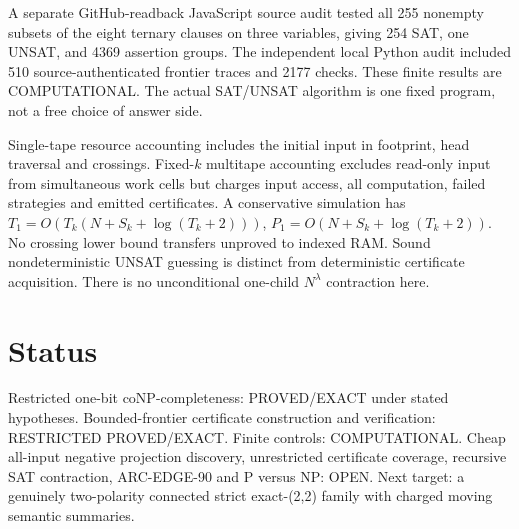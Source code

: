 \documentclass[11pt]{article}
\begin{document}
A separate GitHub-readback JavaScript source audit tested all 255 nonempty subsets of the eight ternary clauses on three variables, giving 254 SAT, one UNSAT, and 4369 assertion groups. The independent local Python audit included 510 source-authenticated frontier traces and 2177 checks. These finite results are COMPUTATIONAL. The actual SAT/UNSAT algorithm is one fixed program, not a free choice of answer side.

Single-tape resource accounting includes the initial input in footprint, head traversal and crossings. Fixed-$k$ multitape accounting excludes read-only input from simultaneous work cells but charges input access, all computation, failed strategies and emitted certificates. A conservative simulation has $T_1=O(T_k(N+S_k+\log(T_k+2)))$, $P_1=O(N+S_k+\log(T_k+2))$. No crossing lower bound transfers unproved to indexed RAM. Sound nondeterministic UNSAT guessing is distinct from deterministic certificate acquisition. There is no unconditional one-child $N^\lambda$ contraction here.

\section{Status}
Restricted one-bit coNP-completeness: PROVED/EXACT under stated hypotheses. Bounded-frontier certificate construction and verification: RESTRICTED PROVED/EXACT. Finite controls: COMPUTATIONAL. Cheap all-input negative projection discovery, unrestricted certificate coverage, recursive SAT contraction, ARC-EDGE-90 and P versus NP: OPEN. Next target: a genuinely two-polarity connected strict exact-(2,2) family with charged moving semantic summaries.
\end{document}
